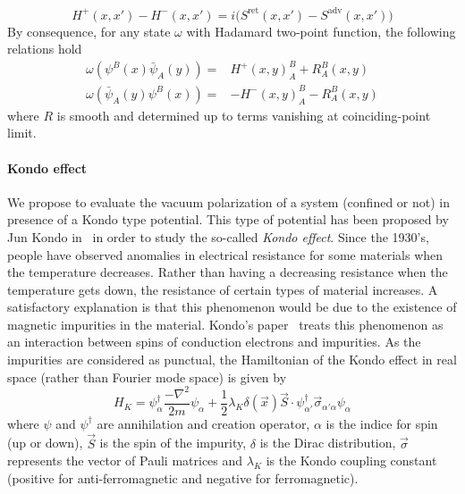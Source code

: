 \begin{equation*}
H^+(x,x') - H^-(x,x') = i\big(S^{\mathrm{ret}}(x,x') - S^{\mathrm{adv}}(x,x')\big)
\end{equation*}
By consequence, for any state $\omega$ with Hadamard two-point function, the following relations hold
\begin{equation*}
\begin{split}
\omega(\psi^B(x)\bar{\psi}_A(y)) = & H^+(x,y)^B_A + R^B_A(x,y) \\
\omega(\bar{\psi}_A(y)\psi^B(x)) = &- H^-(x,y)^B_A - R^B_A(x,y)
\end{split}
\end{equation*}
where $R$ is smooth and determined up to terms vanishing at coinciding-point limit.
%
%
%
\paragraph{Kondo effect}
We propose to evaluate the vacuum polarization of a system (confined or not) 
in presence of a Kondo type potential.
This type of potential has been proposed by Jun Kondo in~\cite{Kondo1964} in order to study the so-called \textit{Kondo effect}.
Since the 1930's, people have observed anomalies in electrical resistance for some materials when the temperature decreases. 
Rather than having a decreasing resistance when the temperature gets down,
the resistance of certain types of material increases. 
A satisfactory explanation is that this phenomenon would be due to the existence of magnetic impurities in the material. 
Kondo's paper~\cite{Kondo1964} treats this phenomenon as an interaction between spins of conduction electrons and impurities.
As the impurities are considered as punctual,
the Hamiltonian of the Kondo effect in real space (rather than Fourier mode space) is given by~\cite{Erdmenger2013}
\begin{equation}\label{vacuum-kondohamiltonian}
H_K = \psi_\alpha^\dagger \frac{-\nabla^2}{2m}\psi_\alpha +
\frac 1 2\lambda_K \delta(\vec{x})\vec{S}\cdot \psi_{\alpha'}^\dagger  \vec{\sigma}_{\alpha' \alpha} \psi_\alpha
\end{equation}
where $\psi$ and $\psi^\dagger$ are annihilation and creation operator, 
$\alpha$ is the indice for spin (up or down), 
$\vec{S}$ is the spin of the impurity,
$\delta$ is the Dirac distribution,
$\vec{\sigma}$ represents the vector of Pauli matrices and $\lambda_K$ is the Kondo coupling constant (positive for anti-ferromagnetic and negative for ferromagnetic).
















